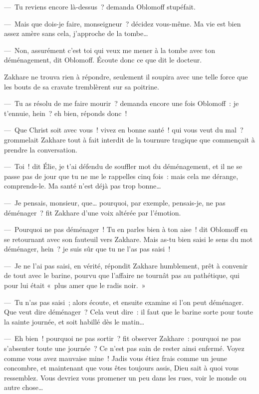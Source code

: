\documentclass[french,twoside]{book} %
\begin{document}
— Tu reviens encore là-dessus ? demanda Oblomoff stupéfait.\par
— Mais que dois-je faire, monseigneur ? décidez vous-même. Ma vie est bien assez amère sans cela, j’approche de la tombe…\par
— Non, assurément c’est toi qui veux me mener à la tombe avec ton déménagement, dit Oblomoff. Écoute donc ce que dit le docteur.\par
Zakhare ne trouva rien à répondre, seulement il soupira avec une telle force que les bouts de sa cravate tremblèrent sur sa poitrine.\par
— Tu as résolu de me faire mourir ? demanda encore une fois Oblomoff : je t’ennuie, hein ? eh bien, réponds donc !\par
— Que Christ soit avec vous ! vivez en bonne santé ! qui vous veut du mal ? grommelait Zakhare tout à fait interdit de la tournure tragique que commençait à prendre la conversation.\par
— Toi ! dit Élie, je t’ai défendu de souffler mot du déménagement, et il ne se passe pas de jour que tu ne me le rappelles cinq fois : mais cela me dérange, comprends-le. Ma santé n’est déjà pas trop bonne…\par
— Je pensais, monsieur, que… pourquoi, par exemple, pensais-je, ne pas déménager ? fit Zakhare d’une voix altérée par l’émotion.\par
— Pourquoi ne pas déménager ! Tu en parles bien à ton aise ! dit Oblomoff en se retournant avec son fauteuil vers Zakhare. Mais as-tu bien saisi le sens du mot déménager, hein ? je suis sûr que tu ne l’as pas saisi !\par
— Je ne l’ai pas saisi, en vérité, répondit Zakhare humblement, prêt à convenir de tout avec le barine, pourvu que l’affaire ne tournât pas au pathétique, qui pour lui était « plus amer que le radis noir. »\par
— Tu n’as pas saisi ; alors écoute, et ensuite examine si l’on peut déménager. Que veut dire déménager ? Cela veut dire : il faut que le barine sorte pour toute la sainte journée, et soit habillé dès le matin…\par
— Eh bien ! pourquoi ne pas sortir ? fit observer Zakhare : pourquoi ne pas s’absenter toute une journée ? Ce n’est pas sain de rester ainsi enfermé. Voyez comme vous avez mauvaise mine ! Jadis vous étiez frais comme un jeune concombre, et maintenant que vous êtes toujours assis, Dieu sait à quoi vous ressemblez. Vous devriez vous promener un peu dans les rues, voir le monde ou autre chose…\par
\end{document}
